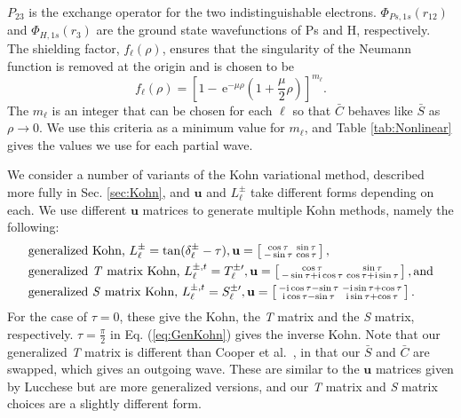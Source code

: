 \documentclass[preprint,showpacs,preprintnumbers,amsmath,amssymb,longbibliography,pra,aps]{revtex4-1}
\newcommand{\ee} {\,\text{e}}
\newcommand{\ii}{{\rm{i}}}
\begin{document}
$P_{23}$ is the exchange operator for the two indistinguishable electrons. $\Phi_{Ps,1s}\left(r_{12}\right)$ and $\Phi_{H,1s}\left(r_3\right)$ are the ground state wavefunctions of Ps and H, respectively. The shielding factor, $f_\ell(\rho)$, ensures that the singularity of the Neumann function is removed at the origin and is chosen to be
\begin{equation}
f_\ell(\rho) = \left[1 - \ee^{-\mu \rho} \left(1+\frac{\mu}{2}\rho\right)\right]^{m_\ell}.
\label{eq:PartialWaveShielding}
\end{equation}
The $m_\ell$ is an integer that can be chosen for each $\ell$ so that $\bar{C}$ behaves like $\bar{S}$ as $\rho \rightarrow 0$. We use this criteria as a minimum value for $m_\ell$, and Table \ref{tab:Nonlinear} gives the values we use for each partial wave.

We consider a number of variants of the Kohn variational method, described more fully in Sec. \ref{sec:Kohn}, and $\textbf{u}$ and $L^{\pm}_\ell$ take different forms depending on each. We use different $\textbf{u}$ matrices to generate multiple Kohn methods, namely the following:
\begin{subequations}
\label{eq:KohnU}
\begin{align}
&\text{generalized Kohn, } L^{\pm}_\ell = \tan(\delta^{\pm}_\ell-\tau), \textbf{u} = \left[ \begin{smallmatrix}
\cos \tau & \sin \tau \\  -\sin \tau & \cos \tau
\end{smallmatrix} \right], \label{eq:GenKohn}\\
&\text{generalized \emph{T} matrix Kohn, } L^{\pm,t}_\ell = T_\ell^{\pm\prime}, \textbf{u} = \left[ \begin{smallmatrix}
\cos\tau & \sin\tau \\ -\sin\tau + \ii \cos\tau & \cos\tau + \ii \sin\tau
\end{smallmatrix} \right], \text{and}\label{eq:GenTKohn} \\
&\text{generalized \emph{S} matrix Kohn, } L^{\pm,t}_\ell = S_\ell^{\pm\prime}, \textbf{u} = \left[ \begin{smallmatrix}
-\ii \cos\tau - \sin\tau & -\ii\sin\tau + \cos\tau \\ \ii\cos\tau - \sin\tau & \ii\sin\tau + \cos\tau
\end{smallmatrix} \right]. \label{eq:GenSKohn}
\end{align}
\end{subequations}
For the case of $\tau = 0$, these give the Kohn, the \emph{T} matrix and the \emph{S} matrix, respectively. $\tau = \frac{\pi}{2}$ in Eq. (\ref{eq:GenKohn}) gives the inverse Kohn. Note that our generalized \emph{T} matrix is different than Cooper et al.\ \cite{Cooper2010}, in that our $\bar{S}$ and $\bar{C}$ are swapped, which gives an outgoing wave. These are similar to the $\textbf{u}$ matrices given by Lucchese \cite{Lucchese1989} but are more generalized versions, and our \emph{T} matrix and \emph{S} matrix choices are a slightly different form.
\end{document}
